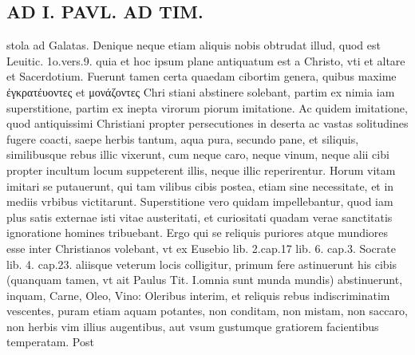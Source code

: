 \documentclass{article}
\begin{document}
\begin{pages}
\section*{AD I. PAVL. AD TIM. }
\marginpar{[ p.378 ]}\pstart stola ad Galatas. Denique neque etiam aliquis nobis obtrudat illud, quod est Leuitic. 1o.vers.9. quia et hoc ipsum plane antiquatum est a Christo, vti et altare et Sacerdotium. Fuerunt tamen certa quaedam cibortim genera, quibus maxime ἐγκρατέυοντες et μονάζοντες Chri stiani abstinere solebant, partim ex nimia iam superstitione, partim ex inepta virorum piorum imitatione. Ac quidem imitatione, quod antiquissimi Christiani propter persecutiones in deserta ac vastas solitudines fugere coacti, saepe herbis tantum, aqua pura, secundo pane, et siliquis, similibusque rebus illic vixerunt, cum neque caro, neque vinum, neque alii cibi propter incultum locum suppeterent illis, neque illic reperirentur. Horum vitam imitari se putauerunt, qui tam vilibus cibis postea, etiam sine necessitate, et in mediis vrbibus victitarunt. Superstitione vero quidam impellebantur, quod iam plus satis externae isti vitae austeritati, et curiositati quadam verae sanctitatis ignoratione homines tribuebant. Ergo qui se reliquis puriores atque mundiores esse inter Christianos volebant, vt ex Eusebio lib. 2.cap.17 lib.  6. cap.3. Socrate lib.  4. cap.23. aliisque veterum locis colligitur, primum fere astinuerunt his cibis (quanquam tamen, vt ait Paulus Tit. I.omnia sunt munda mundis) abstinuerunt, inquam, Carne, Oleo, Vino: Oleribus interim, et reliquis rebus indiscriminatim vescentes, puram etiam aquam potantes, non conditam, non mistam, non saccaro, non herbis vim illius augentibus, aut vsum gustumque gratiorem facientibus temperatam. Post\pend

\end{pages}
\end{document}
